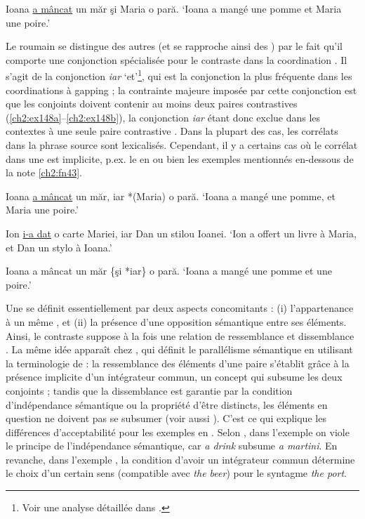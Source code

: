 \ea Ioana \uline{a mâncat} un măr şi Maria o pară. \label{ch2:ex147}
\glt ‘Ioana a mangé une pomme et Maria une poire.’   
\z 

Le roumain se distingue des autres  (et se rapproche ainsi des ) par le fait qu’il comporte une conjonction spécialisée pour le contraste dans la coordination \citep{BilbiieEtAl2011}. Il s’agit de la conjonction \textit{iar} ‘et’\footnote{
 Voir une analyse détaillée dans \citet[chapitre 2]{Bilbiie2011}.}, qui est la conjonction la plus fréquente dans les coordinations à gapping ; la contrainte majeure imposée par cette conjonction est que les conjoints doivent contenir au moins deux paires contrastives (\ref{ch2:ex148a}--\ref{ch2:ex148b}), la conjonction \textit{iar} étant donc exclue dans les contextes à une seule paire contrastive . Dans la plupart des cas, les corrélats dans la phrase source sont lexicalisés. Cependant, il y a certains cas où le corrélat dans une  est implicite, p.ex. le  en  ou bien les exemples mentionnés en-dessous de la note \ref{ch2:fn43}. 

\ea
\ea Ioana \uline{a mâncat} un măr, iar *(Maria) o pară. \label{ch2:ex148a}
\glt ‘Ioana a mangé une pomme, et Maria une poire.’  

\ex Ion \uline{i-a dat} o carte Mariei, iar Dan un stilou Ioanei. \label{ch2:ex148b} 
\glt ‘Ion a offert un livre à Maria, et Dan un stylo à Ioana.’

\ex Ioana a mâncat un măr \{şi {\textbar} *iar\} o pară. \label{ch2:ex148c} 
\glt ‘Ioana a mangé une pomme et une poire.’   
\z
\z

Une  se définit essentiellement par deux aspects concomitants : (i) l’appartenance à un même , et (ii) la présence d’une opposition sémantique entre ses éléments. Ainsi, le contraste suppose à la fois une relation de ressemblance et dissemblance \citep{Sag1976,Rooth1992,VallduviEtAl1998}. La même idée apparaît chez \citet{Umbach2005}, qui définit le parallélisme sémantique en utilisant la terminologie de \citet{Lang1984} : la ressemblance des éléments d’une paire s’établit grâce à la présence implicite d’un intégrateur commun, {\cad} un concept qui subsume les deux conjoints ; tandis que la dissemblance est garantie par la condition d’indépendance sémantique ou la propriété d’être distincts, {\cad} les éléments en question ne doivent pas se subsumer (voir aussi \citealt{Zeevat2004}). C’est ce qui explique les différences d’acceptabilité pour les exemples en . Selon \citet{Umbach2005}, dans l'exemple  on viole le principe de l’indépendance sémantique, car \textit{a drink} subsume \textit{a martini}. En revanche, dans l'exemple , la condition d’avoir un intégrateur commun détermine le choix d’un certain sens (compatible avec \textit{the beer}) pour le syntagme \textit{the port}.  


